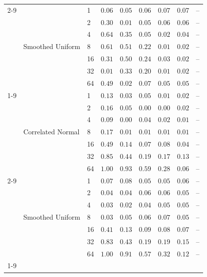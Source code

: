 \begin{tabular}{lllcccccc}
\cmidrule{2-9}
 & \multirow[l]{7}{*}{Smoothed Uniform} & 1 & $0.06$ & $0.05$ & $0.06$ & $0.07$ & $0.07$ & -- \\
 &  & 2 & $0.30$ & $0.01$ & $0.05$ & $0.06$ & $0.06$ & -- \\
 &  & 4 & $0.64$ & $0.35$ & $0.05$ & $0.02$ & $0.04$ & -- \\
 &  & 8 & $0.61$ & $0.51$ & $0.22$ & $0.01$ & $0.02$ & -- \\
 &  & 16 & $0.31$ & $0.50$ & $0.24$ & $0.03$ & $0.02$ & -- \\
 &  & 32 & $0.01$ & $0.33$ & $0.20$ & $0.01$ & $0.02$ & -- \\
 &  & 64 & $0.49$ & $0.02$ & $0.07$ & $0.05$ & $0.05$ & -- \\
\cmidrule{1-9} \cmidrule{2-9}
\multirow[l]{14}{*}{jFMMI} & \multirow[l]{7}{*}{Correlated Normal} & 1 & $0.13$ & $0.03$ & $0.05$ & $0.01$ & $0.02$ & -- \\
 &  & 2 & $0.16$ & $0.05$ & $0.00$ & $0.00$ & $0.02$ & -- \\
 &  & 4 & $0.09$ & $0.00$ & $0.04$ & $0.02$ & $0.01$ & -- \\
 &  & 8 & $0.17$ & $0.01$ & $0.01$ & $0.01$ & $0.01$ & -- \\
 &  & 16 & $0.49$ & $0.14$ & $0.07$ & $0.08$ & $0.04$ & -- \\
 &  & 32 & $0.85$ & $0.44$ & $0.19$ & $0.17$ & $0.13$ & -- \\
 &  & 64 & $1.00$ & $0.93$ & $0.59$ & $0.28$ & $0.06$ & -- \\
\cmidrule{2-9}
 & \multirow[l]{7}{*}{Smoothed Uniform} & 1 & $0.07$ & $0.08$ & $0.05$ & $0.05$ & $0.06$ & -- \\
 &  & 2 & $0.04$ & $0.04$ & $0.06$ & $0.06$ & $0.05$ & -- \\
 &  & 4 & $0.03$ & $0.02$ & $0.04$ & $0.05$ & $0.05$ & -- \\
 &  & 8 & $0.03$ & $0.05$ & $0.06$ & $0.07$ & $0.05$ & -- \\
 &  & 16 & $0.41$ & $0.13$ & $0.09$ & $0.08$ & $0.07$ & -- \\
 &  & 32 & $0.83$ & $0.43$ & $0.19$ & $0.19$ & $0.15$ & -- \\
 &  & 64 & $1.00$ & $0.91$ & $0.57$ & $0.32$ & $0.12$ & -- \\
\cmidrule{1-9} \bottomrule
\end{tabular}
